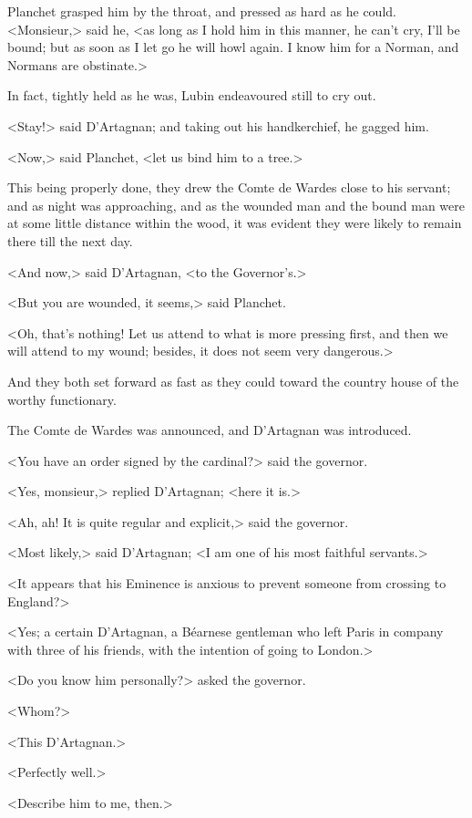 Planchet grasped him by the throat, and pressed as hard as he could. <Monsieur,> said he, <as long as I hold him in this manner, he can't cry, I'll be bound; but as soon as I let go he will howl again. I know him for a Norman, and Normans are obstinate.> 

In fact, tightly held as he was, Lubin endeavoured still to cry out. 

<Stay!> said D'Artagnan; and taking out his handkerchief, he gagged him. 

<Now,> said Planchet, <let us bind him to a tree.> 

This being properly done, they drew the Comte de Wardes close to his servant; and as night was approaching, and as the wounded man and the bound man were at some little distance within the wood, it was evident they were likely to remain there till the next day. 

<And now,> said D'Artagnan, <to the Governor's.> 

<But you are wounded, it seems,> said Planchet. 

<Oh, that's nothing! Let us attend to what is more pressing first, and then we will attend to my wound; besides, it does not seem very dangerous.> 

And they both set forward as fast as they could toward the country house of the worthy functionary. 

The Comte de Wardes was announced, and D'Artagnan was introduced. 

<You have an order signed by the cardinal?> said the governor. 

<Yes, monsieur,> replied D'Artagnan; <here it is.> 

<Ah, ah! It is quite regular and explicit,> said the governor. 

<Most likely,> said D'Artagnan; <I am one of his most faithful servants.> 

<It appears that his Eminence is anxious to prevent someone from crossing to England?> 

<Yes; a certain D'Artagnan, a Béarnese gentleman who left Paris in company with three of his friends, with the intention of going to London.> 

<Do you know him personally?> asked the governor. 

<Whom?> 

<This D'Artagnan.> 

<Perfectly well.> 

<Describe him to me, then.> 

